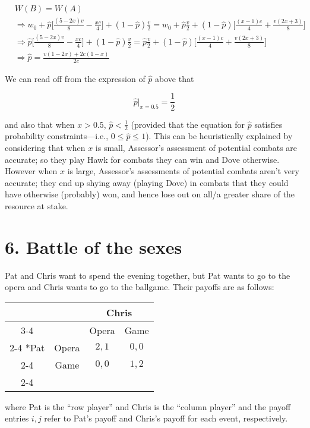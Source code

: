 \documentclass{article}
\begin{document}
\begin{align*}
    &W(B) = W(A) \\
    &\Rightarrow
        w_0 + \hat{p} \Big[\frac{(5 - 2 x) v}{8} - \frac{x c}{4}\Big]
        + (1 - \hat{p}) \frac{v}{2}
        =
        w_0 + \hat{p} \frac{v}{2}
        + (1 - \hat{p}) \Big[\frac{(x - 1) c}{4} + \frac{v (2 x + 3)}{8}\Big] \\
    &\Rightarrow
        \hat{p} \Big[\frac{(5 - 2 x) v}{8} - \frac{x c}{4}\Big]
        + (1 - \hat{p}) \frac{v}{2}
        =
        \hat{p} \frac{v}{2}
        + (1 - \hat{p}) \Big[\frac{(x - 1) c}{4} + \frac{v (2 x + 3)}{8}\Big] \\
    &\Rightarrow \hat{p} = \frac{v (1 - 2 x) + 2 c (1 - x)}{2 c}
\end{align*}

We can read off from the expression of $\hat{p}$ above that

\begin{equation*}
    \hat{p}\bigr|_{x=0.5} = \frac{1}{2}
\end{equation*}

and also that when $x > 0.5$, $\hat{p} < \frac{1}{2}$ (provided that the
equation for $\hat{p}$ satisfies probability constraints---i.e., $0 \leq
\hat{p} \leq 1$). This can be heuristically explained by considering
that when $x$ is small, Assessor's assessment of potential combats are
accurate; so they play Hawk for combats they can win and Dove otherwise.
However when $x$ is large, Assessor's assessments of potential combats
aren't very accurate; they end up shying away (playing Dove) in combats
that they could have otherwise (probably) won, and hence lose out on
all/a greater share of the resource at stake.

\section*{6. Battle of the sexes}

Pat and Chris want to spend the evening together, but Pat wants to go to
the opera and Chris wants to go to the ballgame. Their payoffs are as
follows:

\begin{center}
\setlength{\extrarowheight}{2pt}
\begin{tabular}{*{4}{c|}}
    \multicolumn{2}{c}{} & \multicolumn{2}{c}{Chris}\\\cline{3-4}
    \multicolumn{1}{c}{} &  & Opera & Game \\\cline{2-4}
    \multirow{2}*{Pat} & Opera & $2,1$ & $0,0$ \\\cline{2-4}
      & Game & $0,0$ & $1,2$ \\\cline{2-4}
\end{tabular}
\end{center}

where Pat is the ``row player'' and Chris is the ``column player'' and
the payoff entries $i, j$ refer to Pat's payoff and Chris's payoff for
each event, respectively.
\end{document}
